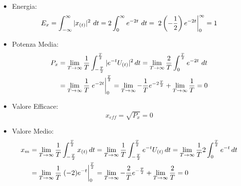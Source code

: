         \begin{itemize}
            \item {Energia:
                \[
                    E_{x} = \int_{-\infty}^{\infty} |x_{(t)}|^2 \ dt =2 \int_{0}^{\infty} e^{-2t}\ dt = \eval*{2 \left(-\frac{1}{2}\right) e^{-2t}}_{0}^{\infty} = 1 
                \]
            }
            \item {Potenza Media:
                \begin{align}
                    P_{x} & =\lim_{T\rightarrow\infty}  \frac{1}{T} \int_{-\frac{T}{2}}^{\frac{T}{2}}  |e^{-t}U_{(t)}|^2 \,dt =\lim_{T\rightarrow\infty} \frac{2}{T} \int_{0}^{\frac{T}{2}} e^{-2t}\ dt \nonumber \\
                          & = \lim_{T\rightarrow\infty} \frac{1}{T} \eval*{e^{-2t}}_{0}^{\frac{T}{2}} =\lim_{T\rightarrow\infty}-\frac{1}{T} e^{-2\frac{T}{2}} + \lim_{T\rightarrow\infty} \frac{1}{T} = 0 \nonumber 
                \end{align}
            }
            \item {Valore Efficace:
                \[
                    x_{eff} = \sqrt{P_{x}} = 0 
                \]
            }
            \item {Valore Medio:
                    \begin{align}
                        x_{m} & = \lim_{T\rightarrow\infty} \frac{1}{T} \int_{-\frac{T}{2}}^{\frac{T}{2}}  x_{(t)} \,dt =\lim_{T\rightarrow\infty} \frac{1}{T} \int_{-\frac{T}{2}}^{\frac{T}{2}} e^{-t}U_{(t)}\,dt = \lim_{T\rightarrow\infty} \frac{1}{T} 2\int_{0}^{\frac{T}{2}} e^{-t}\,dt \nonumber \\
                              & = \lim_{T\rightarrow\infty} \frac{1}{T} \eval*{(-2) e^{-t}}_{0}^{\frac{T}{2}} =  \lim_{T\rightarrow\infty}-\frac{2}{T} e^{-\frac{T}{2}} + \lim_{T\rightarrow\infty} \frac{2}{T} = 0 \nonumber
                    \end{align}
            }
        \end{itemize}        

